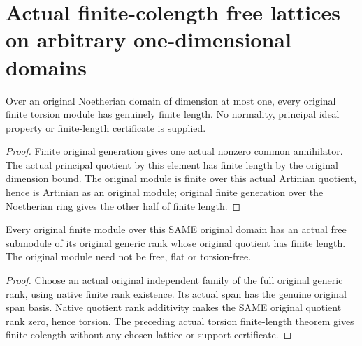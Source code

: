 \section{Actual finite-colength free lattices on arbitrary one-dimensional domains}

\begin{theorem}
\label{thm:fc-one-dimensional-torsion-finite-length}
\leanok
{}
Over an original Noetherian domain of dimension at most one,
every original finite torsion module has genuinely finite length.
No normality, principal ideal property or finite-length certificate
is supplied.
\end{theorem}
\begin{proof}
Finite original generation gives one actual nonzero common
annihilator. The actual principal quotient by this element has
finite length by the original dimension bound. The original module
is finite over this actual Artinian quotient, hence is Artinian
as an original module; original finite generation over the
Noetherian ring gives the other half of finite length.
\end{proof}

\begin{theorem}
\label{thm:fc-one-dimensional-full-free-lattice}
\leanok
{}
Every original finite module over this SAME original domain has
an actual free submodule of its original generic rank whose
original quotient has finite length. The original module need not
be free, flat or torsion-free.
\end{theorem}
\begin{proof}
Choose an actual original independent family of the full original
generic rank, using native finite rank existence. Its actual span
has the genuine original span basis. Native quotient rank
additivity makes the SAME original quotient rank zero, hence
torsion. The preceding actual torsion finite-length theorem gives
finite colength without any chosen lattice or support certificate.
\end{proof}
